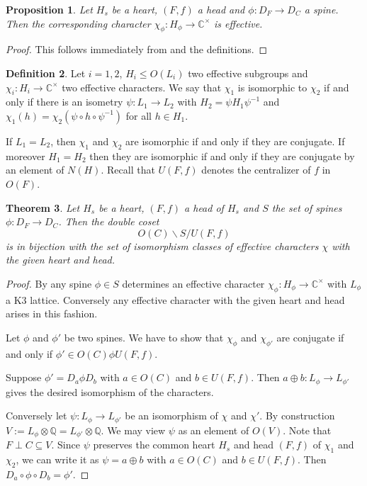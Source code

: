 \documentclass[a4paper]{amsart}
\theoremstyle{definition}
\newtheorem{definition}{Definition}[section]
\theoremstyle{plain}
\newtheorem{theorem}[definition]{Theorem}
\newtheorem{proposition}[definition]{Proposition}
\newcommand{\QQ}{\mathbb{Q}}
\newcommand{\CC}{\mathbb{C}}
\newcommand{\disc}[1]{{D_{#1}}}
\begin{document}
\begin{proposition}\label{effectivespine}
 Let $H_s$ be a heart, $(F,f)$ a head and $\phi\colon \disc{F} \to \disc{C}$ a spine.
 Then the corresponding character $\chi_\phi \colon H_\phi \to \CC^\times$ is effective.
\end{proposition}
\begin{proof}
This follows immediately from  and the definitions.
\end{proof}
\begin{definition}
Let $i=1,2$, $H_i \leq O(L_i)$ two effective subgroups and
$\chi_i\colon H_i \to \CC^\times$ two effective characters.
We say that $\chi_1$ is isomorphic to $\chi_2$ if and only if there is an isometry $\psi \colon L_1 \to L_2$ with $H_2 = \psi H_1 \psi^{-1}$ and $\chi_1(h) = \chi_2(\psi \circ h \circ \psi^{-1})$ for all $h \in H_1$.
\end{definition}
If $L_1=L_2$, then $\chi_1$ and $\chi_2$ are isomorphic if and only if they are conjugate.
If moreover $H_1=H_2$ then they are isomorphic if and only if they are conjugate by an element of $N(H)$.
Recall that $U(F,f)$ denotes the centralizer of $f$ in $O(F)$.
\begin{theorem}\label{fiber}
Let $H_s$ be a heart, $(F,f)$ a head of $H_s$ and $S$ the set of spines
$\phi \colon \disc{F} \to \disc{C}$.
Then the double coset
\[O(C) \backslash S / U(F,f)\]
is in bijection with the set of isomorphism classes of effective characters $\chi$ with the given heart and head.
\end{theorem}
\begin{proof}
By  any spine $\phi \in S$ determines an effective character $\chi_\phi\colon H_\phi \to \CC^\times$ with $L_\phi$ a K3 lattice.
Conversely any effective character with the given heart and head arises in this fashion.

Let $\phi$ and $\phi'$ be two spines. We have to show that $\chi_\phi$ and $\chi_{\phi'}$ are conjugate if and only if $\phi' \in O(C) \phi U(F,f)$.

Suppose $\phi' = D_a \phi D_b$ with $a \in O(C)$ and $b \in U(F,f)$. Then $a \oplus b\colon L_\phi \to L_{\phi'}$ gives the desired isomorphism of the characters.

Conversely let $\psi\colon L_\phi \to L_{\phi'}$ be an isomorphism of $\chi$ and $\chi'$.
By construction $V:=L_\phi \otimes \QQ=L_{\phi'}\otimes \QQ$. We may view $\psi$ as an element of $O(V)$. Note that $F \perp C \subseteq V$. Since $\psi$ preserves the common heart $H_s$ and head $(F,f)$ of $\chi_1$ and $\chi_2$, we can write it as $\psi = a \oplus b$ with $a \in O(C)$ and $b \in U(F,f)$. Then $ D_a \circ \phi \circ D_b = \phi'$.
\end{proof}
\end{document}
